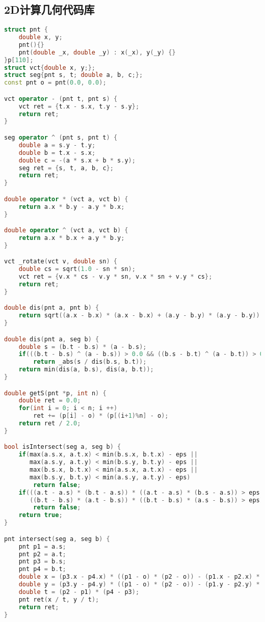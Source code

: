\subsection{2D计算几何代码库}
    \begin{lstlisting}[language=c++]
struct pnt {
    double x, y;
    pnt(){}
    pnt(double _x, double _y) : x(_x), y(_y) {}
}p[110];
struct vct{double x, y;};
struct seg{pnt s, t; double a, b, c;};
const pnt o = pnt(0.0, 0.0);

vct operator - (pnt t, pnt s) {
    vct ret = {t.x - s.x, t.y - s.y};
    return ret;
}

seg operator ^ (pnt s, pnt t) {
    double a = s.y - t.y;
    double b = t.x - s.x;
    double c = -(a * s.x + b * s.y);
    seg ret = {s, t, a, b, c};
    return ret;
}

double operator * (vct a, vct b) {
    return a.x * b.y - a.y * b.x;
}

double operator ^ (vct a, vct b) {
    return a.x * b.x + a.y * b.y;
}

vct _rotate(vct v, double sn) {
    double cs = sqrt(1.0 - sn * sn);
    vct ret = {v.x * cs - v.y * sn, v.x * sn + v.y * cs};
    return ret;
}

double dis(pnt a, pnt b) {
    return sqrt((a.x - b.x) * (a.x - b.x) + (a.y - b.y) * (a.y - b.y));
}

double dis(pnt a, seg b) {
    double s = (b.t - b.s) * (a - b.s);
    if(((b.t - b.s) ^ (a - b.s)) > 0.0 && ((b.s - b.t) ^ (a - b.t)) > 0.0)
        return _abs(s / dis(b.s, b.t));
    return min(dis(a, b.s), dis(a, b.t));
}

double getS(pnt *p, int n) {
    double ret = 0.0;
    for(int i = 0; i < n; i ++)
        ret += (p[i] - o) * (p[(i+1)%n] - o);
    return ret / 2.0;
}

bool isIntersect(seg a, seg b) {
    if(max(a.s.x, a.t.x) < min(b.s.x, b.t.x) - eps ||
       max(a.s.y, a.t.y) < min(b.s.y, b.t.y) - eps ||
       max(b.s.x, b.t.x) < min(a.s.x, a.t.x) - eps ||
       max(b.s.y, b.t.y) < min(a.s.y, a.t.y) - eps)
        return false;
    if(((a.t - a.s) * (b.t - a.s)) * ((a.t - a.s) * (b.s - a.s)) > eps ||
       ((b.t - b.s) * (a.t - b.s)) * ((b.t - b.s) * (a.s - b.s)) > eps)
        return false;
    return true;
}

pnt intersect(seg a, seg b) {
    pnt p1 = a.s;
    pnt p2 = a.t;
    pnt p3 = b.s;
    pnt p4 = b.t;
    double x = (p3.x - p4.x) * ((p1 - o) * (p2 - o)) - (p1.x - p2.x) * ((p3 - o) * (p4 - o));
    double y = (p3.y - p4.y) * ((p1 - o) * (p2 - o)) - (p1.y - p2.y) * ((p3 - o) * (p4 - o));
    double t = (p2 - p1) * (p4 - p3);
    pnt ret(x / t, y / t);
    return ret;
}


\end{lstlisting}
